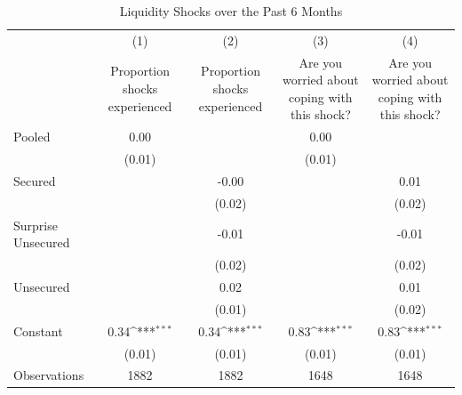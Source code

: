\begin{table}[htbp]\centering
\def\sym#1{\ifmmode^{#1}\else\(^{#1}\)\fi}
\caption{Liquidity Shocks over the Past 6 Months\label{shock\_B}}
\begin{tabular}{l*{4}{c}}
\toprule
                    &\multicolumn{1}{c}{(1)}&\multicolumn{1}{c}{(2)}&\multicolumn{1}{c}{(3)}&\multicolumn{1}{c}{(4)}\\
                    &\multicolumn{1}{c}{Proportion shocks experienced}&\multicolumn{1}{c}{Proportion shocks experienced}&\multicolumn{1}{c}{Are you worried about coping with this shock?}&\multicolumn{1}{c}{Are you worried about coping with this shock?}\\
\midrule
Pooled              &        0.00         &                     &        0.00         &                     \\
                    &      (0.01)         &                     &      (0.01)         &                     \\\addlinespace
Secured             &                     &       -0.00         &                     &        0.01         \\
                    &                     &      (0.02)         &                     &      (0.02)         \\\addlinespace
Surprise Unsecured  &                     &       -0.01         &                     &       -0.01         \\
                    &                     &      (0.02)         &                     &      (0.02)         \\\addlinespace
Unsecured           &                     &        0.02         &                     &        0.01         \\
                    &                     &      (0.01)         &                     &      (0.02)         \\\addlinespace
Constant            &        0.34\sym{***}&        0.34\sym{***}&        0.83\sym{***}&        0.83\sym{***}\\
                    &      (0.01)         &      (0.01)         &      (0.01)         &      (0.01)         \\
\midrule
Observations        &        1882         &        1882         &        1648         &        1648         \\
\bottomrule
\end{tabular}
\end{table}
